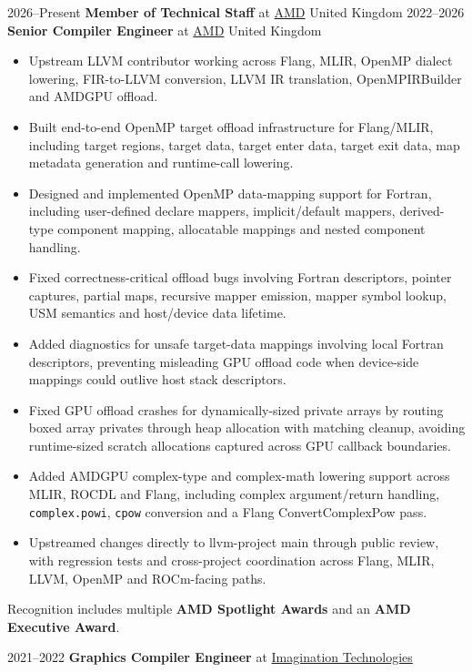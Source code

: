 \documentclass[a4paper]{cv-style}
\begin{document}
\begin{entrylist}
\headlineonly
  {2026--Present}
  {\textbf{Member of Technical Staff} at \href{https://www.amd.com/en}{AMD}}
  {United Kingdom}
\headlineentry
  {2022--2026}
  {\textbf{Senior Compiler Engineer} at \href{https://www.amd.com/en}{AMD}}
  {United Kingdom}
  {\begin{itemize}
    \item Upstream LLVM contributor working across Flang, MLIR, OpenMP dialect lowering, FIR-to-LLVM conversion, LLVM IR translation, OpenMPIRBuilder and AMDGPU offload.
    \item Built end-to-end OpenMP target offload infrastructure for Flang/MLIR, including target regions, target data, target enter data, target exit data, map metadata generation and runtime-call lowering.
    \item Designed and implemented OpenMP data-mapping support for Fortran, including user-defined declare mappers, implicit/default mappers, derived-type component mapping, allocatable mappings and nested component handling.
    \item Fixed correctness-critical offload bugs involving Fortran descriptors, pointer captures, partial maps, recursive mapper emission, mapper symbol lookup, USM semantics and host/device data lifetime.
    \item Added diagnostics for unsafe target-data mappings involving local Fortran descriptors, preventing misleading GPU offload code when device-side mappings could outlive host stack descriptors.
    \item Fixed GPU offload crashes for dynamically-sized private arrays by routing boxed array privates through heap allocation with matching cleanup, avoiding runtime-sized scratch allocations captured across GPU callback boundaries.
    \item Added AMDGPU complex-type and complex-math lowering support across MLIR, ROCDL and Flang, including complex argument/return handling, \texttt{complex.powi}, \texttt{cpow} conversion and a Flang ConvertComplexPow pass.
    \item Upstreamed changes directly to llvm-project main through public review, with regression tests and cross-project coordination across Flang, MLIR, LLVM, OpenMP and ROCm-facing paths.
  \end{itemize}
  Recognition includes multiple \textbf{AMD Spotlight Awards} and an \textbf{AMD Executive Award}.}
\headlineentry
  {2021--2022}
  {\textbf{Graphics Compiler Engineer} at \href{https://imaginationtech.com/}{Imagination Technologies}}

\end{entrylist}
\end{document}
